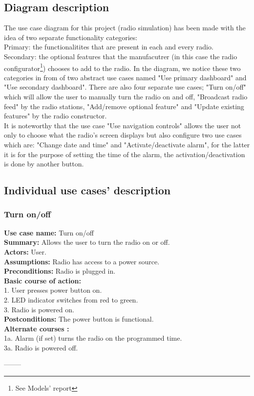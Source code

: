 \documentclass[11pt]{article}
\begin{document}
\subsection{Diagram description}
The use case diagram for this project (radio simulation) has been made with the idea of two separate functionality categories:\\
Primary: the functionalitites that are present in each and every radio.\\
Secondary: the optional features that the manufacutrer (in this case the radio configurator\footnote{See Models' report}) chooses to add to the radio.
In the diagram, we notice these two categories in from of two abstract use cases named "Use primary dashboard" and "Use secondary dashboard". There are also four separate use cases; "Turn on/off" which will allow the user to manually turn the radio on and off, "Broadcast radio feed" by the radio stations, "Add/remove optional feature" and "Update existing features" by the radio constructor.\\
It is noteworthy that the use case "Use navigation controls" allows the user not only to choose what the radio's screen displays but also configure two use cases which are: "Change date and time" and "Activate/deactivate alarm", for the latter it is for the purpose of setting the time of the alarm, the activation/deactivation is done by another button.

\subsection{Individual use cases' description}
\subsubsection{Turn on/off}
\textbf{Use case name:} Turn on/off\\
\textbf{Summary:} Allows the user to turn the radio on or off.\\
\textbf{Actors:} User.\\
\textbf{Assumptions:} Radio has access to a power source.\\
\textbf{Preconditions:} Radio is plugged in.\\
\textbf{Basic course of action:}\\
\hspace*{10mm}1. User presses power button on.\\
\hspace*{10mm}2. LED indicator switches from red to green.\\
\hspace*{10mm}3. Radio is powered on.\\
\textbf{Postconditions: }The power button is functional.\\
\textbf{Alternate courses :}\\
\hspace*{10mm}1a. Alarm (if set) turns the radio on the programmed time.\\ 
\hspace*{10mm}3a. Radio is powered off.
\begin{center}--------\end{center}
\end{document}
